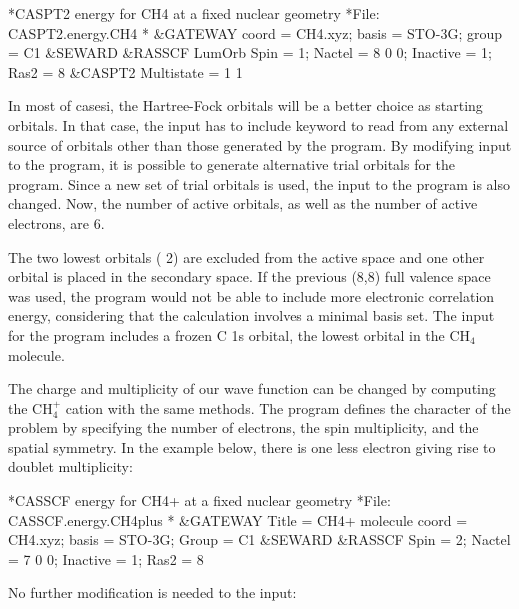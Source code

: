 \begin{inputlisting}
*CASPT2 energy for CH4 at a fixed nuclear geometry
*File: CASPT2.energy.CH4
*
&GATEWAY
 coord = CH4.xyz; basis = STO-3G; group = C1
&SEWARD
&RASSCF
   LumOrb
   Spin = 1; Nactel = 8 0 0; Inactive = 1; Ras2 = 8
&CASPT2
 Multistate = 1 1
\end{inputlisting}

In most of casesi, the Hartree-Fock orbitals will be a better choice as starting orbitals. 
In that case, the  input has to include keyword  to read 
from any external source of orbitals other than those generated by the  program. 
By modifying input to the  program, it is possible to generate 
alternative trial orbitals for the  program. Since a new set of trial orbitals is used,
the input to the  program is also changed. Now, the number of
active orbitals, as well as the number of active electrons, are 6. 

The two lowest orbitals ( 2) are excluded from the active space
and one other orbital is placed in the secondary space.
If the previous (8,8) full valence space was used,
the  program would not be able to include more electronic correlation energy,
considering that the calculation involves a minimal basis set.
The input for the  program includes a frozen C 1s orbital, the lowest orbital
in the CH$_4$ molecule.

The charge and multiplicity of our wave function can be changed by computing the
CH$_4^+$ cation with the same methods. The  program defines
the character of the problem by specifying the number of electrons, the spin multiplicity, and the spatial
symmetry. In the example below, there is one less electron giving rise to doublet multiplicity:

\begin{inputlisting}
*CASSCF energy for CH4+ at a fixed nuclear geometry
*File: CASSCF.energy.CH4plus
*
&GATEWAY
 Title = CH4+ molecule 
 coord = CH4.xyz; basis = STO-3G; Group = C1
&SEWARD
&RASSCF 
   Spin = 2; Nactel = 7 0 0; Inactive = 1; Ras2 = 8
\end{inputlisting}

No further modification is needed to the  input:

